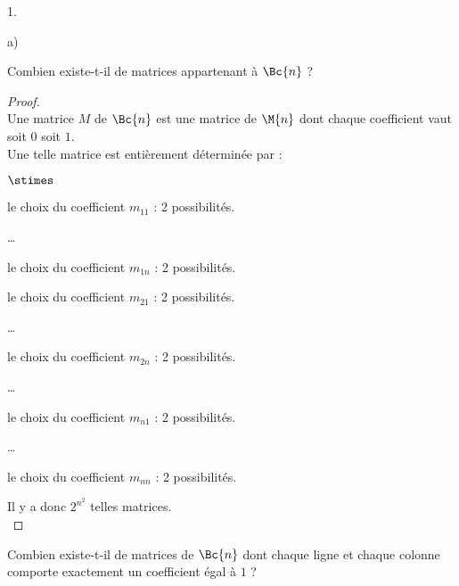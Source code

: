 \documentclass[11pt]{article}%
\begin{document}
\begin{noliste}{1.}
\item 
  \begin{noliste}{a)}
    \setlength{\itemsep}{2mm}
  \item Combien existe-t-il de matrices appartenant à $\Bc{n}$ ?
	
    \begin{proof}~\\%
      Une matrice $M$ de $\Bc{n}$ est une matrice de $\M{n}$ dont
      chaque coefficient vaut soit $0$ soit $1$.\\
      Une telle matrice est entièrement déterminée par :
      \begin{noliste}{$\stimes$}
      \item le choix du coefficient $m_{11}$ : 2 possibilités.
      \item \ldots
      \item le choix du coefficient $m_{1n}$ : 2 possibilités.
      \item le choix du coefficient $m_{21}$ : 2 possibilités.
      \item \ldots
      \item le choix du coefficient $m_{2n}$ : 2 possibilités.
      \item \ldots
      \item le choix du coefficient $m_{n1}$ : 2 possibilités.
      \item \ldots
      \item le choix du coefficient $m_{nn}$ : 2 possibilités.
      \end{noliste}
      Il y a donc $2^{n^2}$ telles matrices.%
      ~\\[-1cm]
    \end{proof}
    
  \item Combien existe-t-il de matrices de $\Bc{n}$ dont chaque ligne
    et chaque colonne comporte exactement un coefficient égal à $1$
    ?
	

\end{noliste}
\end{noliste}
\end{document}
